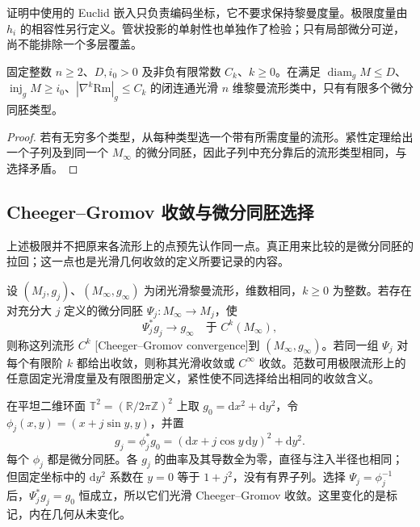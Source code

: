 证明中使用的 Euclid 嵌入只负责编码坐标，它不要求保持黎曼度量。极限度量由 \(h_i\) 的相容性另行定义。管状投影的单射性也单独作了检验；只有局部微分可逆，尚不能排除一个多层覆盖。

\begin{corollary}\label{g3:cor:bounded-geometry-diffeomorphism-finiteness}
	固定整数 \(n\ge2\)、\(D,i_0>0\) 及非负有限常数 \(C_k\)、\(k\ge0\)。在满足 \(\operatorname{diam}_gM\le D\)、\(\operatorname{inj}_gM\ge i_0\)、\(|\nabla^k\mathrm{Rm}|_g\le C_k\) 的闭连通光滑 \(n\) 维黎曼流形类中，只有有限多个微分同胚类型。
\end{corollary}
\begin{proof}
	若有无穷多个类型，从每种类型选一个带有所需度量的流形。紧性定理给出一个子列及到同一个 \(M_\infty\) 的微分同胚，因此子列中充分靠后的流形类型相同，与选择矛盾。
\end{proof}

\subsection{Cheeger–Gromov 收敛与微分同胚选择}
\label{g3:subsec:2901:04}
上述极限并不把原来各流形上的点预先认作同一点。真正用来比较的是微分同胚的拉回；这一点也是光滑几何收敛的定义所要记录的内容。

\begin{definition}\label{g3:def:cheeger-gromov-convergence}
	设 \((M_j,g_j)\)、\((M_\infty,g_\infty)\) 为闭光滑黎曼流形，维数相同，\(k\ge0\) 为整数。若存在对充分大 \(j\) 定义的微分同胚
	\(\Psi_j:M_\infty\to M_j\)，使
	\[
		\Psi_j^*g_j\longrightarrow g_\infty\quad\text{于 }C^k(M_\infty),
	\]
	则称这列流形 \(C^k\) [Cheeger--Gromov convergence]到 \((M_\infty,g_\infty)\)。若同一组 \(\Psi_j\) 对每个有限阶 \(k\) 都给出收敛，则称其光滑收敛或 \(C^\infty\) 收敛。范数可用极限流形上的任意固定光滑度量及有限图册定义，紧性使不同选择给出相同的收敛含义。
\end{definition}

\begin{example}\label{g3:exm:coordinate-oscillation-smooth-limit}
	在平坦二维环面 \(\mathbb T^2=(\mathbb R/2\pi\mathbb Z)^2\) 上取 \(g_0=\mathrm dx^2+\mathrm dy^2\)，令
	\(\phi_j(x,y)=(x+j\sin y,y)\)，并置
	\[
		g_j=\phi_j^*g_0=(\mathrm dx+j\cos y\,\mathrm dy)^2+\mathrm dy^2.
	\]
	每个 \(\phi_j\) 都是微分同胚。各 \(g_j\) 的曲率及其导数全为零，直径与注入半径也相同；但固定坐标中的 \(\mathrm dy^2\) 系数在 \(y=0\) 等于 \(1+j^2\)，没有有界子列。选择 \(\Psi_j=\phi_j^{-1}\) 后，\(\Psi_j^*g_j=g_0\) 恒成立，所以它们光滑 Cheeger--Gromov 收敛。这里变化的是标记，内在几何从未变化。
\end{example}


